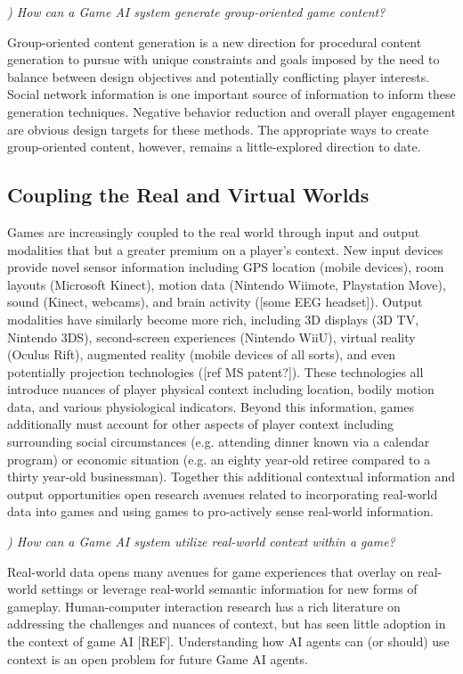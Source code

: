 \documentclass[conference]{IEEEtran}
\newcounter{questionno}
\newcommand{\subsubsectionx}[1]{{\em {\arabic{questionno}) #1}}
	\addtocounter{questionno}{1}
	}
\begin{document}
\subsubsectionx{How can a Game AI system generate group-oriented game content?}
%
Group-oriented content generation is a new direction for procedural content generation to pursue with unique constraints and goals imposed by the need to balance between design objectives and potentially conflicting player interests. Social network information is one important source of information to inform these generation techniques. Negative behavior reduction and overall player engagement are obvious design targets for these methods. The appropriate ways to create group-oriented content, however, remains a little-explored direction to date. 


\subsection{Coupling the Real and Virtual Worlds}

Games are increasingly coupled to the real world through input and output modalities that but a greater premium on a player's context. New input devices provide novel sensor information including GPS location (mobile devices), room layouts (Microsoft Kinect), motion data (Nintendo Wiimote, Playstation Move), sound (Kinect, webcams), and brain activity ([some EEG headset]). Output modalities have similarly become more rich, including 3D displays (3D TV, Nintendo 3DS), second-screen experiences (Nintendo WiiU), virtual reality (Oculus Rift), augmented reality (mobile devices of all sorts), and even potentially projection technologies ([ref MS patent?]). These technologies all introduce nuances of player physical context including location, bodily motion data, and various physiological indicators. Beyond this information, games additionally must account for other aspects of player context including surrounding social circumstances (e.g. attending dinner known via a calendar program) or economic situation (e.g. an eighty year-old retiree compared to a thirty year-old businessman). Together this additional contextual information and output opportunities open research avenues related to incorporating real-world data into games and using games to pro-actively sense real-world information.

\subsubsectionx{How can a Game AI system utilize real-world context within a game?}
%
Real-world data opens many avenues for game experiences that overlay on real-world settings or leverage real-world semantic information for new forms of gameplay. Human-computer interaction research has a rich literature on addressing the challenges and nuances of context, but has seen little adoption in the context of game AI [REF]. 
Understanding how AI agents can (or should) use context is an open problem for future Game AI agents.
\end{document}
